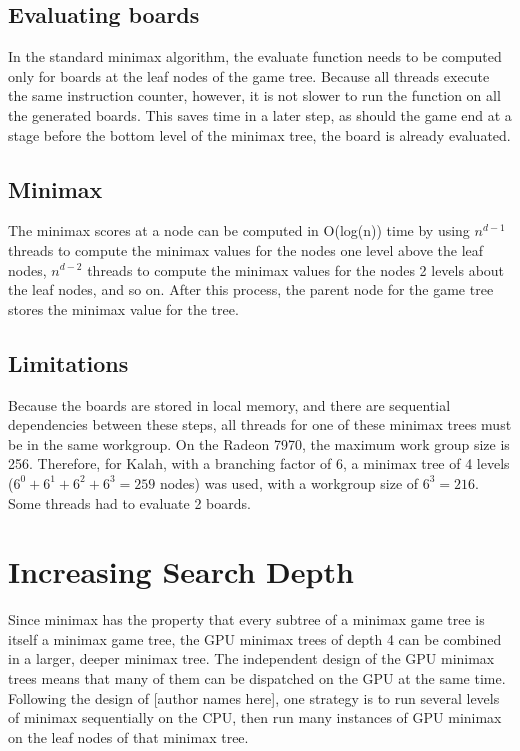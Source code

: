 \documentclass{article}
\begin{document}
\subsection{Evaluating boards}
In the standard minimax algorithm, the evaluate function needs to be computed only for boards at the leaf nodes of the game tree. Because all threads execute the same instruction counter, however, it is not slower to run the function on all the generated boards. This saves time in a later step, as should the game end at a stage before the bottom level of the minimax tree, the board is already evaluated.

\subsection{Minimax}
The minimax scores at a node can be computed in O(log(n)) time by using $n^{d-1}$ threads to compute the minimax values for the nodes one level above the leaf nodes, $n^{d-2}$ threads to compute the minimax values for the nodes 2 levels about the leaf nodes, and so on. After this process, the parent node for the game tree stores the minimax value for the tree.

\subsection{Limitations}
Because the boards are stored in local memory, and there are sequential dependencies between these steps, all threads for one of these minimax trees must be in the same workgroup. On the Radeon 7970, the maximum work group size is 256. Therefore, for Kalah, with a branching factor of 6, a minimax tree of 4 levels ($6^0 + 6^1 + 6^2 + 6^3 = 259$ nodes) was used, with a workgroup size of $6^3 = 216$. Some threads had to evaluate 2 boards.

\section{Increasing Search Depth}
Since minimax has the property that every subtree of a minimax game tree is itself a minimax game tree, the GPU minimax trees of depth 4 can be combined in a larger, deeper minimax tree. The independent design of the GPU minimax trees means that many of them can be dispatched on the GPU at the same time. Following the design of [author names here], one strategy is to run several levels of minimax sequentially on the CPU, then run many instances of GPU minimax on the leaf nodes of that minimax tree.
\end{document}
